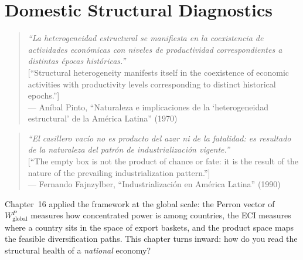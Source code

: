 \documentclass[../structural_economics_book.tex]{subfiles}
\begin{document}
\ifSubfilesClassLoaded{\setcounter{chapter}{16}}{}
\chapter{Domestic Structural Diagnostics}\label{ch:17}
\begin{quote}
\textit{``La heterogeneidad estructural se manifiesta en la coexistencia de actividades econ\'{o}micas con niveles de productividad correspondientes a distintas \'{e}pocas hist\'{o}ricas.''}\\[0.3em]
\textnormal{[``Structural heterogeneity manifests itself in the coexistence of economic activities with productivity levels corresponding to distinct historical epochs.'']}\\
\hfill --- An\'{i}bal Pinto, ``Naturaleza e implicaciones de la `heterogeneidad estructural' de la Am\'{e}rica Latina'' (1970)
\end{quote}
\nocite{pinto1970naturaleza}

\vspace{0.3em}

\begin{quote}
\textit{``El casillero vac\'{i}o no es producto del azar ni de la fatalidad: es resultado de la naturaleza del patr\'{o}n de industrializaci\'{o}n vigente.''}\\[0.3em]
\textnormal{[``The empty box is not the product of chance or fate: it is the result of the nature of the prevailing industrialization pattern.'']}\\
\hfill --- Fernando Fajnzylber, ``Industrializaci\'{o}n en Am\'{e}rica Latina'' (1990)
\end{quote}
\nocite{fajnzylber1990industrializacion}

\vspace{1em}

Chapter~16 applied the framework at the global scale: the Perron vector of $W^P_{\text{global}}$ measures how concentrated power is among countries, the ECI measures where a country sits in the space of export baskets, and the product space maps the feasible diversification paths. This chapter turns inward: how do you read the structural health of a \textit{national} economy?
\end{document}
